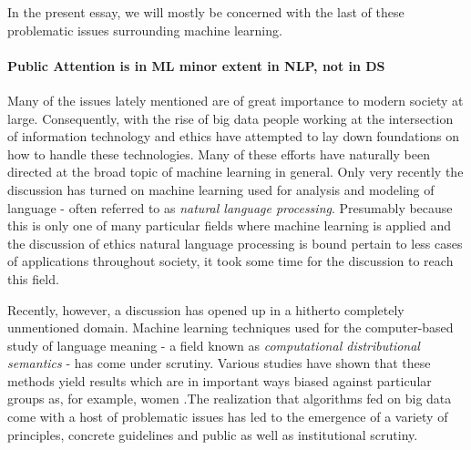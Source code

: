 \documentclass{article}
\begin{document}
In the present essay, we will mostly be concerned with the last of these problematic issues surrounding machine learning.


\paragraph{Public Attention is in ML minor extent in NLP, not in DS}
Many of the issues lately mentioned are of great importance to modern society at large. Consequently, with the rise of big data people working at the intersection of information technology and ethics have attempted to lay down foundations on how to handle these technologies. Many of these efforts have naturally been directed at the broad topic of machine learning in general.\cite{leidner2017ehtical} Only very recently the discussion has turned on machine learning used for analysis and modeling of language - often referred to as \emph{natural language processing}. Presumably because this is only one of many particular fields where machine learning is applied and the discussion of ethics natural language processing is bound pertain to less cases of applications throughout society, it took some time for the discussion to reach this field.

Recently, however, a discussion has opened up in a hitherto completely unmentioned domain. Machine learning techniques used for the computer-based study of language meaning - a field known as \emph{computational distributional semantics} - has come under scrutiny.
Various studies have shown that these methods yield results which are in important ways biased against particular groups as, for example, women \cite{google} \cite{wagner2015s}.The realization that algorithms fed on big data come with a host of problematic issues has led to the emergence of a variety of principles, concrete guidelines and public as well as institutional scrutiny.
\end{document}
